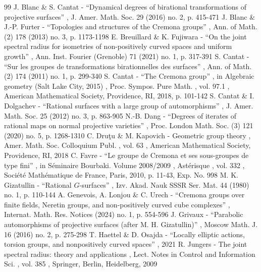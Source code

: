 \documentclass[11pt]{article}
\numberwithin{equation}{section}
\theoremstyle{plain}
\theoremstyle{definition}
\begin{document}

\begin{thebibliography}{99}
 J. Blanc \& S. Cantat - “Dynamical degrees of birational transformations of projective surfaces” , J. Amer. Math. Soc. 29 (2016) no. 2, p. 415-471
 J. Blanc \& J.-P. Furter - “Topologies and structures of the Cremona groups” , Ann. of Math. (2) 178 (2013) no. 3, p. 1173-1198
 E. Breuillard \& K. Fujiwara - “On the joint spectral radius for isometries of non-positively curved spaces and uniform growth” , Ann. Inst. Fourier (Grenoble) 71 (2021) no. 1, p. 317-391
 S. Cantat - “Sur les groupes de transformations birationnelles des surfaces” , Ann. of Math. (2) 174 (2011) no. 1, p. 299-340
 S. Cantat - “The Cremona group” , in Algebraic geometry (Salt Lake City, 2015) , Proc. Sympos. Pure Math. , vol. 97.1 , American Mathematical Society, Providence, RI, 2018, p. 101-142
 S. Cantat \& I. Dolgachev - “Rational surfaces with a large group of automorphisms” , J. Amer. Math. Soc. 25 (2012) no. 3, p. 863-905
 N.-B. Dang - “Degrees of iterates of rational maps on normal projective varieties” , Proc. London Math. Soc. (3) 121 (2020) no. 5, p. 1268-1310
 C. Druţu \& M. Kapovich - Geometric group theory , Amer. Math. Soc. Colloquium Publ. , vol. 63 , American Mathematical Society, Providence, RI, 2018
 C. Favre - “Le groupe de Cremona et ses sous-groupes de type fini” , in Séminaire Bourbaki. Volume 2008/2009 , Astérisque , vol. 332 , Société Mathématique de France, Paris, 2010, p. 11-43, Exp. No. 998
 M. K. Gizatullin - “Rational $G$-surfaces” , Izv. Akad. Nauk SSSR Ser. Mat. 44 (1980) no. 1, p. 110-144
 A. Genevois, A. Lonjou \& C. Urech - “Cremona groups over finite fields, Neretin groups, and non-positively curved cube complexes” , Internat. Math. Res. Notices (2024) no. 1, p. 554-596
 J. Grivaux - “Parabolic automorphisms of projective surfaces (after M. H. Gizatullin)” , Moscow Math. J. 16 (2016) no. 2, p. 275-298
 T. Haettel \& D. Osajda - “Locally elliptic actions, torsion groups, and nonpositively curved spaces” , 2021
 R. Jungers - The joint spectral radius: theory and applications , Lect. Notes in Control and Information Sci. , vol. 385 , Springer, Berlin, Heidelberg, 2009

\end{thebibliography}
\end{document}
